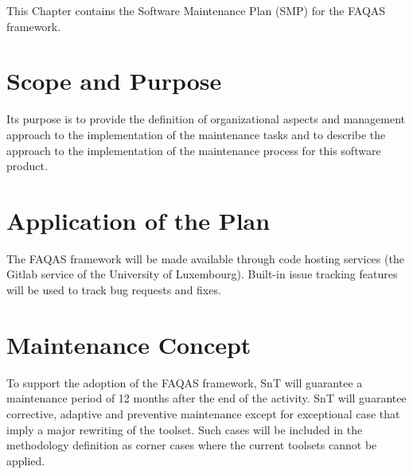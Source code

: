 
This Chapter contains the Software Maintenance Plan (SMP) for the FAQAS framework.

\section{Scope and Purpose}

Its purpose is to provide the definition of organizational aspects and management approach to the implementation of the maintenance tasks and to describe the approach to the implementation of the maintenance process for this software product.

\section{Application of the Plan}

 The FAQAS framework will be made available through code hosting services (the Gitlab service of the University of Luxembourg). Built-in issue tracking features will be used to track bug requests and fixes.

\section{Maintenance Concept}

To support the adoption of the FAQAS framework, SnT will guarantee a maintenance period of 12 months after the end of the activity.
SnT will guarantee corrective, adaptive and preventive maintenance except for exceptional case that imply a major rewriting of the toolset.
Such cases will be included in the methodology definition as corner cases where the current toolsets cannot be applied.
